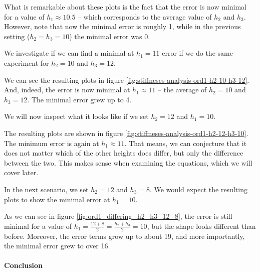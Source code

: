 \documentclass{article}
\newcommand{\todo}[2][]{\textcolor{red}{TODO\ifthenelse{\equal{#1}{}}{}{[#1]}: #2}}
\newcommand{\done}[2][]{\textcolor{green!50!black}{DONE\ifthenelse{\equal{#1}{}}{}{[#1]}: #2}}
\begin{document}
What is remarkable about these plots is the fact that the error is now minimal for a value of $h_1\approx 10.5$ -- which corresponds to the average value of $h_2$ and $h_3$. However, note that now the minimal error is roughly 1, while in the previous setting ($h_2=h_3=10$) the minimal error was 0.

We investigate if we can find a minimal at $h_1=11$ error if we do the same experiment for $h_2=10$ and $h_3=12$.



We can see the resulting plots in figure \ref{fig:stiffneses-analysis-ord1-h2-10-h3-12}. And, indeed, the error is now minimal at $h_1\approx 11$ -- the average of $h_2=10$ and $h_3=12$. The minimal error grew up to 4.

We will now inspect what it looks like if we set $h_2=12$ and $h_1=10$.



The resulting plots are shown in figure \ref{fig:stiffneses-analysis-ord1-h2-12-h3-10}. The minimum error is again at $h_1\approx 11$. That means, we can conjecture that it does not matter which of the other heights does differ, but only the difference between the two. This makes sense when examining the equations, which we will cover later.


In the next scenario, we set $h_2=12$ and $h_3=8$. We would expect the resulting plots to show the minimal error at $h_1=10$.



As we can see in figure \ref{fig:ord1_differing_h2_h3_12_8}, the error is still minimal for a value of $h_1=\frac{12+8}{2}=\frac{h_2+h_3}{2}=10$, but the shape looks different than before. Moreover, the error terms grow up to about 19, and more importantly, the minimal error grew to over 16.

\paragraph{Conclusion}

\end{document}
